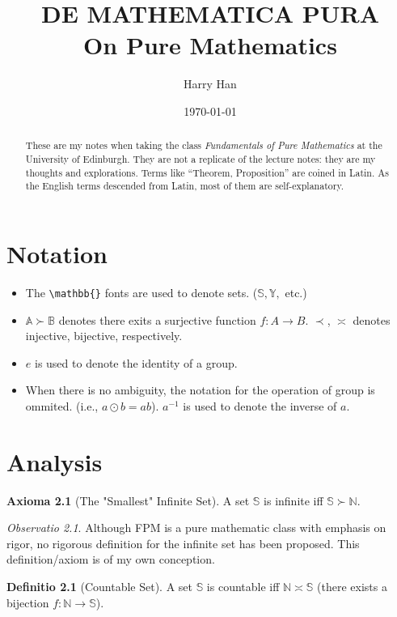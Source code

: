 \documentclass[12pt, a4paper]{report}
\title{
	DE MATHEMATICA PURA \\
	\large On Pure Mathematics
}
\author{Harry Han}
\date{\today}
\theoremstyle{definition}
\newtheorem{definition}{Definitio}[section]
\theoremstyle{definition}
\newtheorem{axiom}{Axioma}[section]
\theoremstyle{remark}
\newtheorem{remark}{Observatio}[section]
\begin{document}
\maketitle
\tableofcontents

\newpage

\begin{abstract}
	These are my notes when taking the class \emph{Fundamentals of Pure Mathematics} at the University of Edinburgh. They are not a replicate of the lecture notes: they are my thoughts and explorations. 
	Terms like ``Theorem, Proposition'' are coined in Latin. As the English terms descended from Latin, most of them are self-explanatory. 
\end{abstract}
\chapter{Notation}

\begin{itemize}
	\item The \verb|\mathbb{}| fonts are used to denote sets. ($\mathbb{S}, \mathbb{Y},$ etc.)
	\item $\mathbb{A} \succ \mathbb{B}$ denotes there exits a surjective function $f:A\rightarrow B$. $\prec$, $\asymp$ denotes injective, bijective, respectively.
	\item $e$ is used to denote the identity of a group.
	\item When there is no ambiguity, the notation for the operation of group is ommited. (i.e., $a \odot b = ab$).
		$a^{-1}$ is used to denote the inverse of $a$.

\end{itemize}

\chapter{Analysis}
\begin{axiom}[The "Smallest" Infinite Set]
	A set $\mathbb{S}$ is infinite iff $\mathbb{S} \succ \mathbb{N}$. 
\end{axiom}

\begin{remark}
	Although FPM is a pure mathematic class with emphasis on rigor, no rigorous definition for the infinite set has been proposed. This definition/axiom is of my own conception.
\end{remark}

\begin{definition}[Countable Set]
	A set $\mathbb{S}$ is countable iff $\mathbb{N} \asymp \mathbb{S}$ (there exists a bijection $f:\mathbb{N} \rightarrow \mathbb{S}$).
\end{definition}
\end{document}
